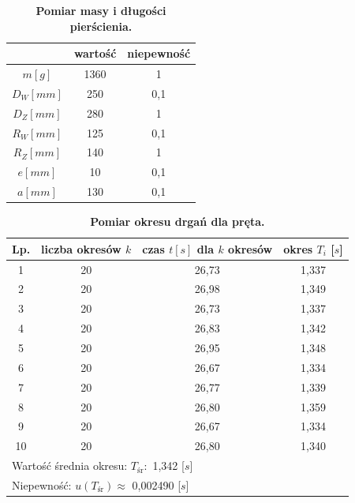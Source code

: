 \documentclass[a4paper,11pt]{article}
\begin{document}
\begin{table}[ht]
\label{table:2}
\centering
\setlength{\extrarowheight}{2pt}
\caption{\textbf{Pomiar masy i długości pierścienia.}}
\begin{tabular}{| @{\hspace{8mm}}c @{\hspace{8mm}}| @{\hspace{8mm}}c @{\hspace{8mm}}|@{\hspace{8mm}} c@{\hspace{8mm}}|}
\hline
 & wartość & niepewność  \\ \hline
$m[g]$ & 1360 & 1 \\ \hline
$D_{W}[mm]$ & 250 & 0,1 \\ \hline
$D_{Z}[mm]$ & 280 & 1 \\ \hline
$R_{W}[mm]$ & 125 & 0,1 \\ \hline
$R_{Z}[mm]$ & 140 & 1 \\ \hline
$e[mm]$ & 10 & 0,1 \\ \hline
$a[mm]$ & 130 & 0,1 \\ \hline

\end{tabular}
\end{table}

\begin{table}[ht]
\vspace*{0.5 cm}
\centering
\setlength{\extrarowheight}{2pt}
\caption{\textbf{Pomiar okresu drgań dla pręta.}}
\label{table:okres1}
\begin{tabular}{|c|c|c|c|}
\hline
Lp. & liczba okresów $k$ & czas $t[s]$ dla $k$ okresów & okres $T_{i}$ [$s$] \\ \hline
1 & 20 & 26,73 & 1,337\\ \hline
2 & 20 & 26,98 & 1,349\\ \hline
3 & 20 & 26,73 & 1,337\\ \hline
4 & 20 & 26,83 & 1,342\\ \hline
5 & 20 & 26,95 & 1,348\\ \hline
6 & 20 & 26,67 & 1,334\\ \hline
7 & 20 & 26,77 & 1,339\\ \hline
8 & 20 & 26,80 & 1,359\\ \hline
9 & 20 & 26,67 & 1,334\\ \hline
10 & 20 & 26,80 & 1,340\\ \hline
\multicolumn{4}{|l|}{Wartość średnia okresu: $T_{\text{śr}} \colon $ 1,342 [$s$]} \\ \hline
\multicolumn{4}{|l|}{Niepewność: $u(T_{\text{śr}})\approx$  0,002490 [$s$]} \\ \hline
\end{tabular}


\end{table}
\end{document}
